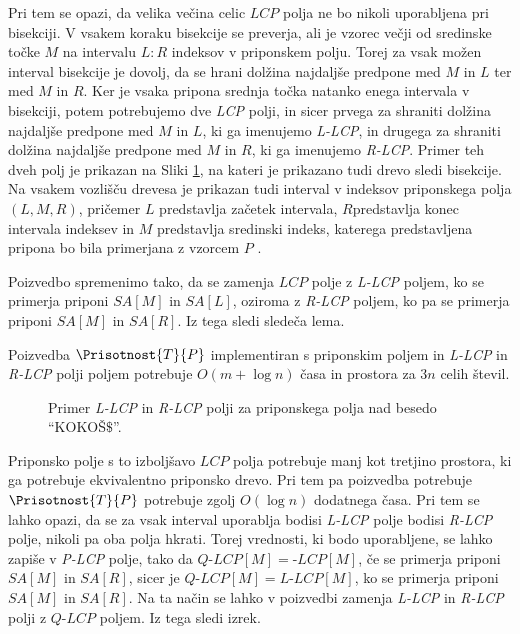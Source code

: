 Pri tem se opazi, da velika večina celic $LCP$ polja ne bo nikoli uporabljena pri bisekciji. V vsakem koraku bisekcije se preverja, ali je vzorec večji od sredinske točke $M$ na intervalu $L:R$ indeksov v priponskem polju. Torej za vsak možen interval bisekcije je dovolj, da se hrani dolžina najdaljše predpone med $M$ in $L$ ter med $M$ in $R$. Ker je vsaka pripona srednja točka natanko enega intervala v bisekciji, potem potrebujemo dve \textit{LCP} polji, in sicer prvega za shraniti dolžina najdaljše predpone med $M$ in $L$, ki ga imenujemo \textit{L-LCP}, in drugega za shraniti dolžina najdaljše predpone med $M$ in $R$, ki ga imenujemo \textit{R-LCP}. Primer teh dveh polj je prikazan na Sliki \ref{fig:RlcpLlcpSuffuxArray}, na kateri je prikazano tudi drevo sledi bisekcije. Na vsakem vozlišču drevesa je prikazan tudi interval v indeksov priponskega  polja $(L,M,R)$, pričemer $L$ predstavlja začetek intervala, $R$predstavlja konec intervala indeksev in $M$ predstavlja sredinski indeks, katerega predstavljena pripona bo bila primerjana z vzorcem $P$ \cite{Manber1990}. 

Poizvedbo spremenimo tako, da se zamenja $LCP$ polje z \textit{L-LCP} poljem, ko se primerja priponi $SA[M]$ in $SA[L]$, oziroma z \textit{R-LCP} poljem, ko pa se primerja priponi $SA[M]$ in $SA[R]$. Iz tega sledi sledeča lema.

\begin{lema}\label{lema:LRLCP}
    Poizvedba $\Prisotnost{T}{P}$ implementiran s priponskim poljem in \textit{L-LCP} in \textit{R-LCP} polji poljem potrebuje $O(m+\log{n})$ časa in prostora za $3n$ celih števil.
\end{lema}

\begin{figure}[htb] 
    
    \centering
    \caption{Primer \textit{L-LCP} in \textit{R-LCP} polji za priponskega polja nad besedo \enquote{KOKOŠ$\$$}.} 
    \label{fig:RlcpLlcpSuffuxArray}
\end{figure}

Priponsko polje s to izboljšavo $LCP$ polja potrebuje manj kot tretjino prostora, ki ga potrebuje ekvivalentno priponsko drevo. Pri tem pa poizvedba potrebuje $\Prisotnost{T}{P}$ potrebuje zgolj $O(\log{n})$ dodatnega časa. Pri tem se lahko opazi, da se za vsak interval uporablja bodisi \textit{L-LCP} polje bodisi \textit{R-LCP} polje, nikoli pa oba polja hkrati. Torej vrednosti, ki bodo uporabljene, se lahko zapiše v \textit{P-LCP} polje, tako da $\textit{Q-LCP}[M]= \textit{-LCP}[M]$, če se primerja priponi $SA[M]$ in $SA[R]$, sicer je $\textit{Q-LCP}[M]= \textit{L-LCP}[M]$, ko se primerja priponi $SA[M]$ in $SA[R]$. Na ta način se lahko v poizvedbi zamenja \textit{L-LCP} in \textit{R-LCP} polji z $\textit{Q-LCP}$ poljem. Iz tega sledi izrek.

